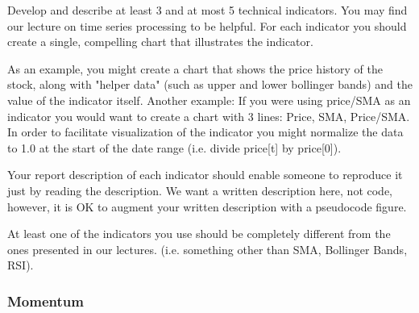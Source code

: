 \documentclass[11pt]{article}
\begin{document}
Develop and describe at least 3 and at most 5 technical indicators. You
may find our lecture on time series processing to be helpful. For each
indicator you should create a single, compelling chart that illustrates
the indicator.

As an example, you might create a chart that shows the price history of
the stock, along with "helper data" (such as upper and lower bollinger
bands) and the value of the indicator itself. Another example: If you
were using price/SMA as an indicator you would want to create a chart
with 3 lines: Price, SMA, Price/SMA. In order to facilitate
visualization of the indicator you might normalize the data to 1.0 at
the start of the date range (i.e. divide price{[}t{]} by price{[}0{]}).

Your report description of each indicator should enable someone to
reproduce it just by reading the description. We want a written
description here, not code, however, it is OK to augment your written
description with a pseudocode figure.

At least one of the indicators you use should be completely different
from the ones presented in our lectures. (i.e. something other than SMA,
Bollinger Bands, RSI).

    \subsubsection{Momentum}\label{momentum}
\end{document}
